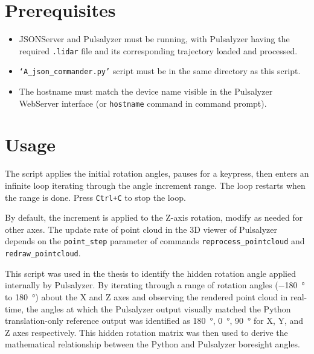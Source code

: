 \section{Prerequisites}
\begin{itemize}
    \item JSONServer and Pulsalyzer must be running, with Pulsalyzer having the required \texttt{.lidar} file and its corresponding trajectory loaded and processed.
    \item \texttt{`A\_json\_commander.py'} script must be in the same directory as this script.
    \item The hostname must match the device name visible in the Pulsalyzer WebServer interface (or \texttt{hostname} command in command prompt).
\end{itemize}

\section{Usage}

The script applies the initial rotation angles, pauses for a keypress, then enters an infinite loop iterating through the angle increment range. The loop restarts when the range is done. Press \texttt{Ctrl+C} to stop the loop.

By default, the increment is applied to the Z-axis rotation, modify as needed for other axes. The update rate of point cloud in the 3D viewer of Pulsalyzer depends on the \texttt{point\_step} parameter of commands \texttt{reprocess\_pointcloud} and \texttt{redraw\_pointcloud}.

This script was used in the thesis to identify the hidden rotation angle applied internally by Pulsalyzer. By iterating through a range of rotation angles (\qty{-180}{\degree} to \qty{180}{\degree}) about the X and Z axes and observing the rendered point cloud in real-time, the angles at which the Pulsalyzer output visually matched the Python translation-only reference output was identified as \qty{180}{\degree}, \qty{0}{\degree}, \qty{90}{\degree} for X, Y, and Z axes respectively. This hidden rotation matrix was then used to derive the mathematical relationship between the Python and Pulsalyzer boresight angles.